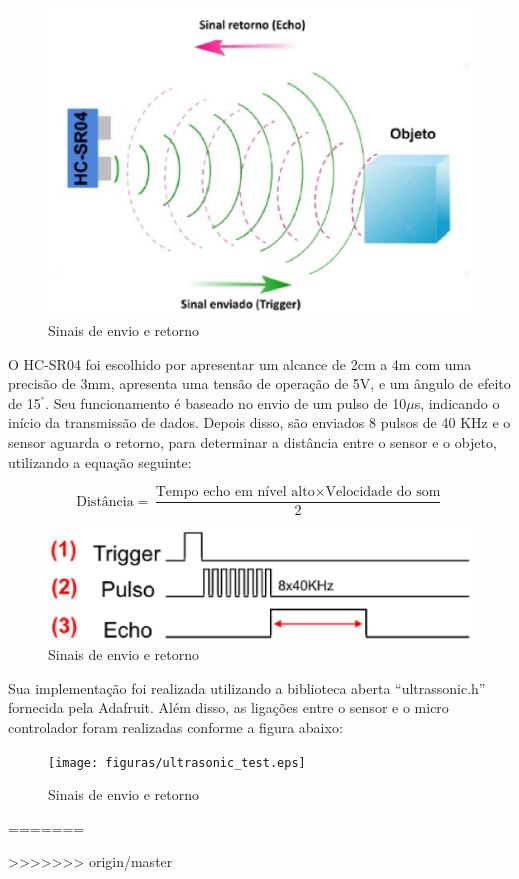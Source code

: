 	\begin{figure}[!htbp]
		\begin{center}
			\includegraphics[width=.4\textwidth]{figuras/echo.eps}
			\caption{Sinais de envio e retorno}
		\end{center}
	\end{figure}

O HC-SR04 foi escolhido por apresentar um alcance de 2cm a 4m com uma precisão de 3mm, apresenta uma tensão de operação de 5V, e um ângulo de efeito de 15$^°$. Seu funcionamento é baseado no envio de um pulso de 10$\mu$s, indicando o início da transmissão de dados. Depois disso, são enviados 8 pulsos de 40 KHz e o sensor aguarda o retorno, para determinar a distância entre o sensor e o objeto, utilizando a equação seguinte:

$$
\textrm{Distância} = \frac{\textrm{Tempo echo em nível alto} \times \textrm{Velocidade do som}}{2}
$$

	\begin{figure}[!htbp]
		\begin{center}
			\includegraphics[width=.4\textwidth]{figuras/hcsr04_signals.eps}
			\caption{Sinais de envio e retorno}
		\end{center}
	\end{figure}

Sua implementação foi realizada utilizando a biblioteca aberta “ultrassonic.h” fornecida pela Adafruit. Além disso, as ligações entre o sensor e o micro controlador foram realizadas conforme a figura abaixo:

	\begin{figure}[!htbp]
		\begin{center}
			\texttt{[image: figuras/ultrasonic\_test.eps]}
			\caption{Sinais de envio e retorno}
		\end{center}
	\end{figure}
=======

>>>>>>> origin/master

